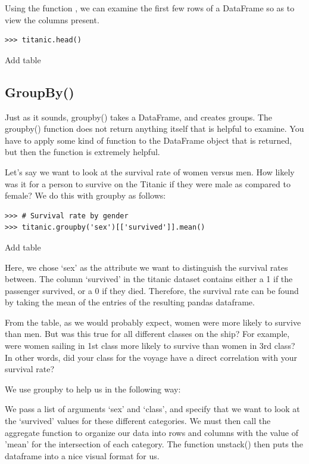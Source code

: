 Using the function , we can examine the first few rows of a DataFrame so as to view the columns present.

\begin{lstlisting}
>>> titanic.head()
\end{lstlisting}

Add table

\subsection*{GroupBy()}
Just as it sounds, groupby() takes a DataFrame, and creates groups. The groupby() function does not return anything itself that is helpful to examine. You have to apply some kind of function to the DataFrame object that is returned, but then the function is extremely helpful.

Let's say we want to look at the survival rate of women versus men. How likely was it for a person to survive on the Titanic if they were male as compared to female? We do this with groupby as follows:

\begin{lstlisting}
>>> # Survival rate by gender
>>> titanic.groupby('sex')[['survived']].mean()
\end{lstlisting}

Add table

Here, we chose `sex' as the attribute we want to distinguish the survival rates between. The column `survived' in the titanic dataset contains either a 1 if the passenger survived, or a 0 if they died. Therefore, the survival rate can be found by taking the mean of the entries of the resulting pandas dataframe.

From the table, as we would probably expect, women were more likely to survive than men. But was this true for all different classes on the ship? For example, were women sailing in 1st class more likely to survive than women in 3rd class? In other words, did your class for the voyage have a direct correlation with your survival rate?

We use groupby to help us in the following way:

We pass a list of arguments `sex' and `class', and specify that we want to look at the `survived' values for these different categories. We must then call the aggregate function to organize our data into rows and columns with the value of 'mean' for the intersection of each category. The function unstack() then puts the dataframe into a nice visual format for us.

